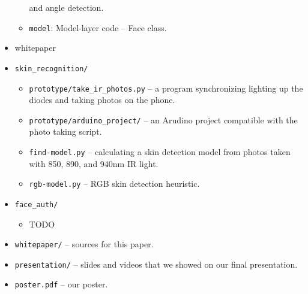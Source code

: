 \begin{itemize}
\begin{itemize}
                      and angle detection.
                \item \texttt{model}: Model-layer code -- Face class.
            \end{itemize}
        \item whitepaper
      \item \texttt{skin\_recognition/}
      \begin{itemize}
          \item \texttt{prototype/take\_ir\_photos.py} -- a program synchronizing
          lighting up the diodes and taking photos on the phone.
          \item \texttt{prototype/arduino\_project/} -- an Arudino project
          compatible with the photo taking script.
          \item \texttt{find-model.py} -- calculating a skin detection model from
          photos taken with 850, 890, and 940nm IR light.
          \item \texttt{rgb-model.py} -- RGB skin detection heuristic.
      \end{itemize}
      \item \texttt{face\_auth/}
      \begin{itemize}
          \item TODO
      \end{itemize}
      \item \texttt{whitepaper/} -- sources for this paper.
      \item \texttt{presentation/} -- slides and videos that we showed on our
      final presentation.
      \item \texttt{poster.pdf} -- our poster.

    \end{itemize}
